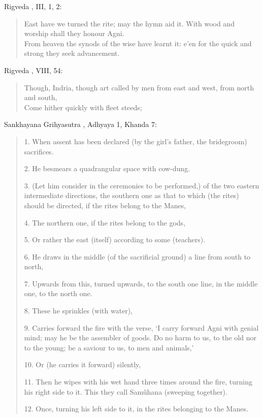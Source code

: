 \documentclass{article}
\begin{document}
Rigveda \cite[p.~405]{rigvedaI}, III, 1, 2:

\begin{quote}
East have we turned the rite; may the hymn aid it. With wood and worship shall they honour
Agni.\\
From heaven the synods of the wise have learnt it: e'en for the quick and strong they
seek advancement.
\end{quote}

Rigveda \cite[p.~277]{rigvedaIII}, VIII, 54:

\begin{quote}
Though, Indria, though art called by men from east and west, from north
and south,\\
Come hither quickly with fleet steeds;
\end{quote}

Sankhayana Grihyasutra \cite[pp.~22--24]{grihyaI}, Adhyaya 1, Khanda 7:

\begin{quote}
1. When assent has been declared (by the girl's father, the bridegroom) sacrifices.

2. He besmears a quadrangular space with cow-dung.

3. (Let him consider in the ceremonies to be performed,) of the two eastern intermediate directions,
the southern one as that to which (the rites) should be directed, if the rites belong to the Manes,

4. The northern one, if the rites belong to the gods,

5. Or rather the east (itself) according to some (teachers).

6. He draws in the middle (of the sacrificial ground) a line from south to north,

7. Upwards from this, turned upwards, to the south one line, in the middle one, to the north one.

8. These he sprinkles (with water),

9. Carries forward the fire with the verse, `I carry forward Agni with genial mind; may he be the assembler
of goods. Do no harm to us, to the old nor to the young; be a saviour to us, to men and animals,'

10. Or (he carries it forward) silently,

11. Then he wipes with his wet hand three times around the fire, turning his right side to it. This
they call Sam\^uhana (sweeping together).

12. Once, turning his left side to it, in the rites belonging to the Manes.
\end{quote}
\end{document}

